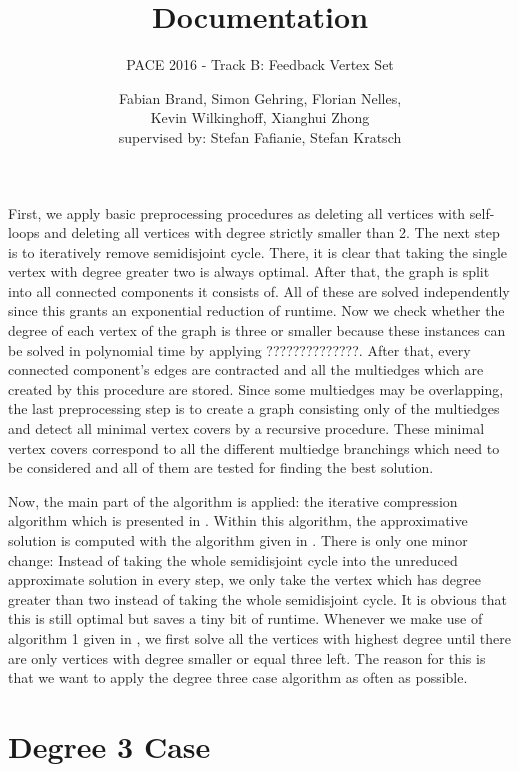 \documentclass[11pt,a4paper]{scrartcl}
\begin{document}
\title{Documentation}
\subtitle{PACE 2016 - Track B: Feedback Vertex Set}
\author{Fabian Brand, Simon Gehring, Florian Nelles,\\ Kevin Wilkinghoff, Xianghui Zhong\\
	supervised by: Stefan Fafianie, Stefan Kratsch}
\maketitle

First, we apply basic preprocessing procedures as deleting all vertices with self-loops and deleting all vertices with degree strictly smaller than 2. The next step is to iteratively remove semidisjoint cycle. There, it is clear that taking the single vertex with degree greater two is always optimal. After that, the graph is split into all connected components it consists of. All of these are solved independently since this grants an exponential reduction of runtime. Now we check whether the degree of each vertex of the graph is three or smaller because these instances can be solved in polynomial time by applying ??????????????. After that, every connected component's edges are contracted and all the multiedges which are created by this procedure are stored. Since some multiedges may be overlapping, the last preprocessing step is to create a graph consisting only of the multiedges and detect all minimal vertex covers by a recursive procedure. These minimal vertex covers correspond to all the different multiedge branchings which need to be considered and all of them are tested for finding the best solution.
\par 
Now, the main part of the algorithm is applied: the iterative compression algorithm which is presented in \cite{chen2008}. Within this algorithm, the approximative solution is computed with the algorithm given in \cite{bafna1999}. There is only one minor change: Instead of taking the whole semidisjoint cycle into the unreduced approximate solution in every step, we only take the vertex which has degree greater than two instead of taking the whole semidisjoint cycle. It is obvious that this is still optimal but saves a tiny bit of runtime. Whenever we make use of algorithm 1 given in \cite{chen2008}, we first solve all the vertices with highest degree until there are only vertices with degree smaller or equal three left. The reason for this is that we want to apply the degree three case algorithm as often as possible.

\section{Degree 3 Case}
\end{document}
